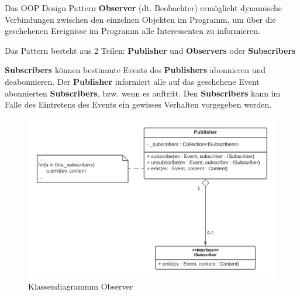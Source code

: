 Das OOP Design Pattern \textbf{Observer} (dt. Beobachter) ermöglicht dynamische Verbindungen zwischen den einzelnen 
Objekten im Programm, um über die geschehenen Ereignisse im Programm alle Interessenten 
zu informieren.

Das Pattern besteht aus 2 Teilen: \textbf{Publisher} und \textbf{Observers} oder \textbf{Subscribers}

\textbf{Subscribers} können bestimmte Events des \textbf{Publishers} abonnieren und deabonnieren. 
Der \textbf{Publisher} informiert alle auf das geschehene Event abonnierten \textbf{Subscribers}, bzw. wenn es auftritt. 
Den \textbf{Subscribers} kann im Falle des Eintretens des Events ein gewisses Verhalten vorgegeben werden.

\begin{figure}[H]
    \centering
    \includegraphics[width=1\textwidth]{Images/Observer.png}
    \caption[UML Observer]{Klassendiagrammm Observer \footnotemark}
    \label{fig:cd_observer}
\end{figure}